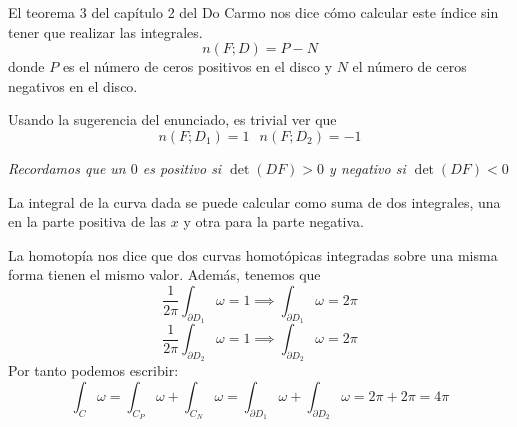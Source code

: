 \begin{problem}[7]
El teorema 3 del capítulo 2 del Do Carmo nos dice cómo calcular este índice sin tener que realizar las integrales.
\[n(F;D)=P-N\]
donde $P$ es el número de ceros positivos en el disco y $N$ el número de ceros negativos en el disco.

Usando la sugerencia del enunciado, es trivial ver que
\[n(F;D_1)=1 \ \; \ n(F;D_2)=-1\]

\textit{Recordamos que un $0$ es positivo si $\det(DF) > 0$ y negativo si $\det(DF) < 0$}

\spart


La integral de la curva dada se puede calcular como suma de dos integrales, una en la parte positiva de las $x$ y otra para la parte negativa.

La homotopía nos dice que dos curvas homotópicas integradas sobre una misma forma tienen el mismo valor.
Además, tenemos que
\[\frac{1}{2π}\int_{∂D_1} ω = 1 \implies \int_{∂D_1} ω = 2π\]
\[\frac{1}{2π}\int_{∂D_2} ω = 1 \implies \int_{∂D_2} ω = 2π\]
Por tanto podemos escribir:
\[\int_C ω = \int_{C_P} ω + \int_{C_N}ω = \int_{\partial D_1} ω + \int_{\partial D_2} ω = 2π+2π = 4π\]

\end{problem}

